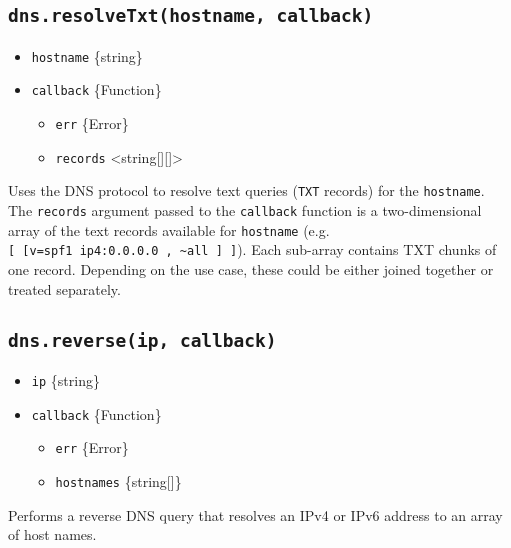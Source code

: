 \subsection{\texorpdfstring{\texttt{dns.resolveTxt(hostname,\ callback)}}{dns.resolveTxt(hostname, callback)}}\label{dns.resolvetxthostname-callback}

\begin{itemize}
\tightlist
\item
  \texttt{hostname} \{string\}
\item
  \texttt{callback} \{Function\}

  \begin{itemize}
  \tightlist
  \item
    \texttt{err} \{Error\}
  \item
    \texttt{records} \textless string{[}{]}{[}{]}\textgreater{}
  \end{itemize}
\end{itemize}

Uses the DNS protocol to resolve text queries (\texttt{TXT} records) for
the \texttt{hostname}. The \texttt{records} argument passed to the
\texttt{callback} function is a two-dimensional array of the text
records available for \texttt{hostname} (e.g.
\texttt{{[}\ {[}\textquotesingle{}v=spf1\ ip4:0.0.0.0\ \textquotesingle{},\ \textquotesingle{}\textasciitilde{}all\textquotesingle{}\ {]}\ {]}}).
Each sub-array contains TXT chunks of one record. Depending on the use
case, these could be either joined together or treated separately.

\subsection{\texorpdfstring{\texttt{dns.reverse(ip,\ callback)}}{dns.reverse(ip, callback)}}\label{dns.reverseip-callback}

\begin{itemize}
\tightlist
\item
  \texttt{ip} \{string\}
\item
  \texttt{callback} \{Function\}

  \begin{itemize}
  \tightlist
  \item
    \texttt{err} \{Error\}
  \item
    \texttt{hostnames} \{string{[}{]}\}
  \end{itemize}
\end{itemize}

Performs a reverse DNS query that resolves an IPv4 or IPv6 address to an
array of host names.

